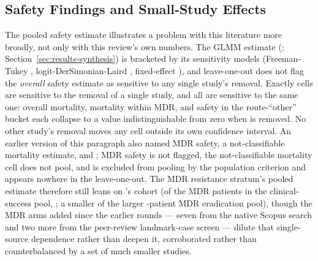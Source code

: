 \subsection{Safety Findings and Small-Study Effects}
\label{sec:discussion-safety}

The pooled safety estimate illustrates a problem with this literature more broadly, not only with this review's own numbers. The GLMM estimate (\SafOverallEstCI; Section~\ref{sec:results-synthesis}) is bracketed by its sensitivity models (Freeman-Tukey \SafOverallFT, logit-DerSimonian-Laird \SafOverallDL, fixed-effect \SafOverallFE), and leave-one-out does not flag the \emph{overall} safety estimate as sensitive to any single study's removal. Exactly \LooSensitiveCells cells are sensitive to the removal of a single study, and all \LooSensitiveCells are sensitive to the same one: overall mortality, mortality within MDR, and safety in the route-``other'' bucket each collapse to a value indistinguishable from zero when \citeauthor{Pirnay2024_natmicrobiol} is removed. No other study's removal moves any cell outside its own confidence interval. An earlier version of this paragraph also named MDR safety, a not-classifiable mortality estimate, and \citeauthor{Jault2019_phagoburn}; MDR safety is not flagged, the not-classifiable mortality cell does not pool, and \citeauthor{Jault2019_phagoburn} is excluded from pooling by the population criterion and appears nowhere in the leave-one-out. The MDR resistance stratum's pooled estimate therefore still leans on \citeauthor{Pirnay2024_natmicrobiol}'s cohort (\PirnayNMDRCs of the \PoolNMDRCs MDR patients in the clinical-success pool, \PirnayShareMDRCs ; a smaller \PirnayShareMDRErad of the larger \PoolNMDRErad -patient MDR eradication pool), though the MDR arms added since the earlier rounds --- seven from the native Scopus search and two more from the peer-review landmark-case screen --- dilute that single-source dependence rather than deepen it, corroborated rather than counterbalanced by a set of much smaller studies.

